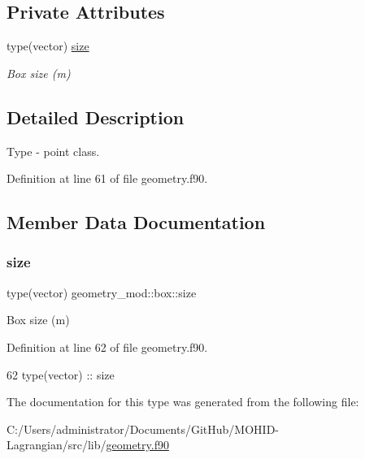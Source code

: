 \subsection*{Private Attributes}
\begin{DoxyCompactItemize}
\item 
type(vector) \mbox{\hyperlink{structgeometry__mod_1_1box_aca87e2761faa8b1ce447347a31fd26f9}{size}}
\begin{DoxyCompactList}\small\item\em Box size (m) \end{DoxyCompactList}\end{DoxyCompactItemize}


\subsection{Detailed Description}
Type -\/ point class. 

Definition at line 61 of file geometry.\+f90.



\subsection{Member Data Documentation}
\mbox{\label{structgeometry__mod_1_1box_aca87e2761faa8b1ce447347a31fd26f9}} 
\subsubsection{\texorpdfstring{size}{size}}
{\footnotesize\ttfamily type(vector) geometry\+\_\+mod\+::box\+::size\hspace{0.3cm}{\ttfamily [private]}}



Box size (m) 



Definition at line 62 of file geometry.\+f90.


\begin{DoxyCode}
62         \textcolor{keywordtype}{type}(vector) :: size
\end{DoxyCode}


The documentation for this type was generated from the following file\+:\begin{DoxyCompactItemize}
\item 
C\+:/\+Users/administrator/\+Documents/\+Git\+Hub/\+M\+O\+H\+I\+D-\/\+Lagrangian/src/lib/\mbox{\hyperlink{geometry_8f90}{geometry.\+f90}}\end{DoxyCompactItemize}
